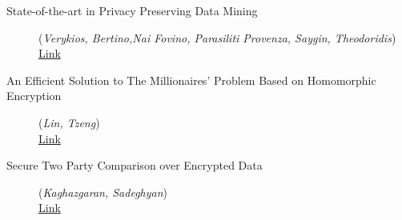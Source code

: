 \documentclass[11pt]{article}
\begin{document}
\begin{description}
	\item [State-of-the-art in Privacy Preserving Data Mining](\emph{Verykios, Bertino,Nai Fovino, Parasiliti Provenza, Saygin, Theodoridis})
	\\ \href{http://www.sigmod.org/publications/sigmod-record/0403/B1.bertion-sigmod-record2.pdf}{Link}
	
	\item [An Efficient Solution to The Millionaires’ Problem Based on Homomorphic Encryption](\emph{Lin, Tzeng})
	\\ \href{http://eprint.iacr.org/2005/043.pdf}{Link}
	                
	\item [Secure Two Party Comparison over Encrypted Data](\emph{Kaghazgaran, Sadeghyan})
	\\ \href{http://ieeexplore.ieee.org/stamp/stamp.jsp?tp=&arnumber=6141405&tag=1}{Link}
\end{description}





\newpage





\end{document}
